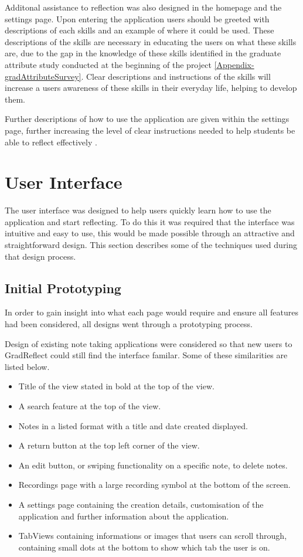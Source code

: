 \documentclass{l4proj}
\begin{document}
Additonal assistance to reflection was also designed in the homepage and the settings page. Upon entering the application users should be greeted with descriptions of each skills and an example of where it could be used. These descriptions of the skills are necessary in educating the users on what these skills are, due to the gap in the knowledge of these skills identified in the graduate attribute study conducted at the beginning of the project \ref{Appendix-gradAttributeSurvey}. Clear descriptions and instructions of the skills will increase a users awareness of these skills in their everyday life, helping to develop them.

Further descriptions of how to use the application are given within the settings page, further increasing the level of clear instructions needed to help students be able to reflect effectively \citep{bruno_reflective_2018}.

\section{User Interface}

The user interface was designed to help users quickly learn how to use the application and start reflecting. To do this it was required that the interface was intuitive and easy to use, this would be made possible through an attractive and straightforward design. This section describes some of the techniques used during that design process.

\subsection{Initial Prototyping}

In order to gain insight into what each page would require and ensure all features had been considered, all designs went through a prototyping process. 

Design of existing note taking applications were considered so that new users to GradReflect could still find the interface familar. Some of these similarities are listed below.

\begin{itemize}
    \item Title of the view stated in bold at the top of the view.
    \item A search feature at the top of the view.
    \item Notes in a listed format with a title and date created displayed.
    \item A return button at the top left corner of the view.
    \item An edit button, or swiping functionality on a specific note, to delete notes.
    \item Recordings page with a large recording symbol at the bottom of the screen.
    \item A settings page containing the creation details, customisation of the application and further information about the application.
    \item TabViews containing informations or images that users can scroll through, containing small dots at the bottom to show which tab the user is on.
\end{itemize}
\end{document}
